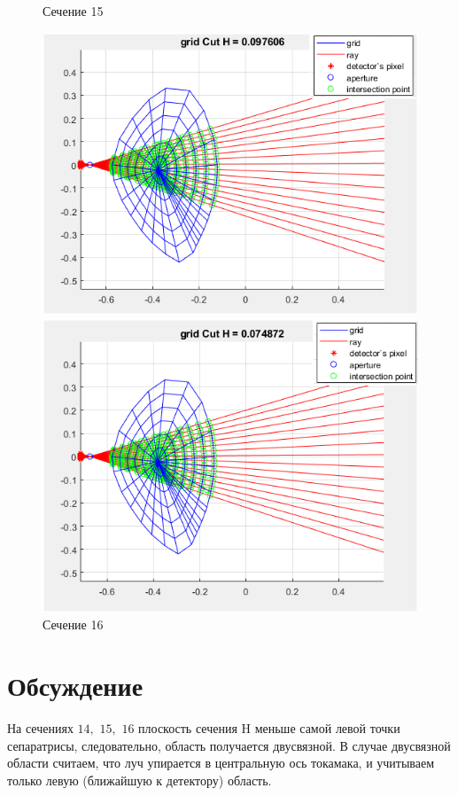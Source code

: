 \documentclass[a4]{article}
\begin{document}
\begin{figure}[H]
\begin{center}
\caption{Сечение 15}
\includegraphics{pic20.png} 

\caption{Сечение 16}
\includegraphics{pic21.png} 
\end{center}
\end{figure}


\section{Обсуждение}
На сечениях $14,$ $15,$ $16$ плоскость сечения H меньше самой левой точки сепаратрисы, следовательно, область получается двусвязной.
В случае двусвязной области считаем, что луч упирается в центральную ось токамака, и учитываем только левую (ближайшую к детектору) область.
    
\end{document}
